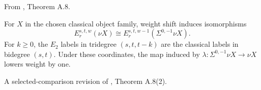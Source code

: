 \begin{definition}
\label{sem:Literature:nu-page-coordinates}
From \cite{BHS}, Theorem A.8.\par

For $X$ in the chosen classical object family, weight shift induces isomorphisms
\[E_r^{s,t,w}(\nu X)\cong E_r^{s,t,w-1}(\Sigma^{0,-1}\nu X).\]
For $k\ge0$, the $E_2$ labels in tridegree $(s,t,t-k)$ are the classical labels in bidegree $(s,t)$. Under these coordinates, the map induced by $\lambda:\Sigma^{0,-1}\nu X\to\nu X$ lowers weight by one.

A selected-comparison revision of \cite{BHS}, Theorem A.8(2).\par


\end{definition}
